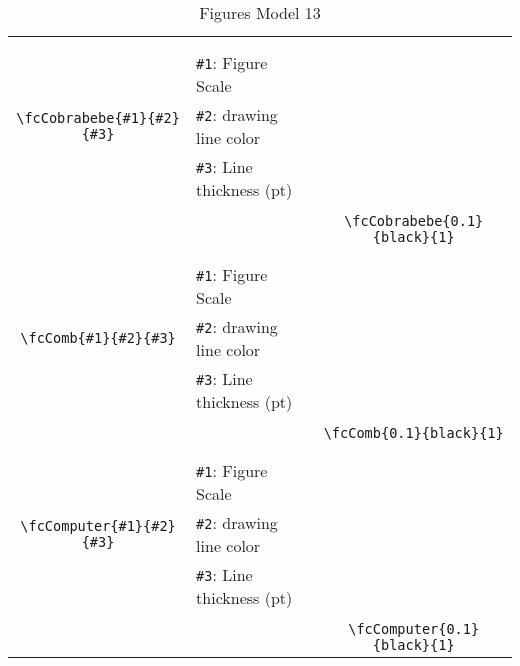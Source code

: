 \documentclass[x11names]{article}
\begin{document}
\begin{table}[H]
\begin{tabular}{|c|l|c|}
	&&\multirow{5}{*}{\fcCobrabebe{0.1}{black}{1}}\\	&&\\	&\verb|#1|: Figure Scale &\\	\verb|\fcCobrabebe{#1}{#2}{#3}|&	\verb|#2|: drawing line color &\\	&\verb|#3|: Line thickness (pt) &\\ &&\\&&	\verb|\fcCobrabebe{0.1}{black}{1}|\\\hline 	
	&&\multirow{5}{*}{\fcComb{0.1}{black}{1}}\\	&&\\	&\verb|#1|: Figure Scale &\\	\verb|\fcComb{#1}{#2}{#3}|&	\verb|#2|: drawing line color &\\	&\verb|#3|: Line thickness (pt) &\\ &&\\&&	\verb|\fcComb{0.1}{black}{1}|\\\hline 	
	&&\multirow{5}{*}{\fcComputer{0.1}{black}{1}}\\	&&\\	&\verb|#1|: Figure Scale &\\	\verb|\fcComputer{#1}{#2}{#3}|&	\verb|#2|: drawing line color &\\	&\verb|#3|: Line thickness (pt) &\\ &&\\&&	\verb|\fcComputer{0.1}{black}{1}|\\\hline 	\hline\end{tabular}\caption{Figures Model 13}\label{tab13}\end{table}
\end{document}
